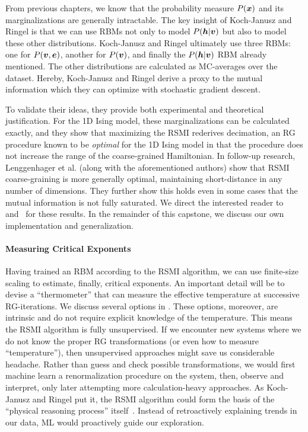From previous chapters, we know that the probability measure $P(\boldsymbol{x})$
and its marginalizations are generally intractable. The key insight of
Koch-Janusz and Ringel is that we can use RBMs not only to model
$P(\boldsymbol{h}\rvert \boldsymbol{v})$ but also to model these other
distributions. Koch-Janusz and Ringel ultimately use three RBMs: one
for $P(\boldsymbol{v},\boldsymbol{e})$, another for $P(\boldsymbol{v})$, and finally the
$P(\boldsymbol{h}\rvert\boldsymbol{v})$ RBM already mentioned. The other distributions are
calculated as MC-averages over the dataset. Hereby, Koch-Janusz and
Ringel derive a proxy to the mutual information 
which they can optimize with stochastic gradient descent.

To validate their ideas, they provide both experimental and
theoretical justification. For the 1D Ising model, these
marginalizations can be calculated exactly, and they show that
maximizing the RSMI rederives decimation, an RG procedure known to be
\textit{optimal} for the 1D Ising model in that the procedure does not
increase the range of the coarse-grained Hamiltonian.  In follow-up
research, Lenggenhager et al. (along with the aforementioned authors)
show that RSMI coarse-graining is more generally optimal, maintaining
short-distance in any number of dimensions. They further show this
holds even in some cases that the mutual information is not fully
saturated.  We direct the interested reader to~\cite{kjr}
and~\cite{lenggenhager} for these results.  In the remainder of this
capstone, we discuss our own implementation and generalization.

\paragraph{Measuring Critical Exponents}
Having trained an RBM according to the RSMI algorithm, we can use
finite-size scaling  to estimate,
finally, critical exponents. An important detail will be to devise a
``thermometer'' that can measure the effective temperature at
successive RG-iterations. We discuss several options in
. These options, moreover, are intrinsic and do
not require explicit knowledge of the temperature. This means the RSMI
algorithm is fully unsupervised. If we encounter new systems where we
do not know the proper RG transformations (or even how to measure
``temperature''), then unsupervised approaches might save us
considerable headache. Rather than guess and check possible
transformations, we would first machine learn a renormalization
procedure on the system, then, observe and interpret, only later
attempting more calculation-heavy approaches. As Koch-Janusz and
Ringel put it, the RSMI algorithm could form the basis of the
``physical reasoning process'' itself~\cite{kjr]}. Instead of retroactively
explaining trends in our data, ML would proactively guide our
exploration.

